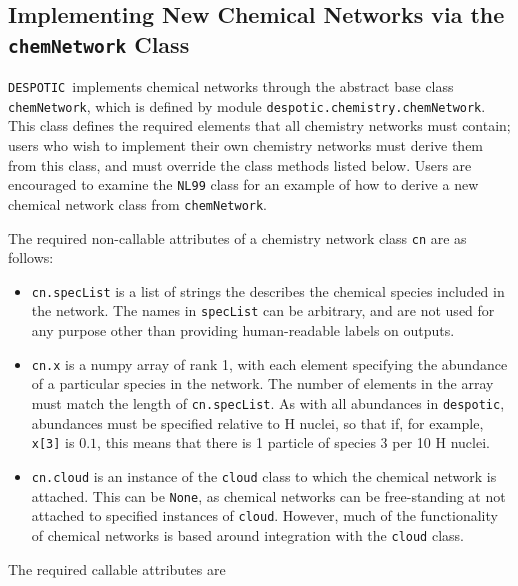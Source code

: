 \documentclass[12pt]{article}
\newcommand{\despotic}{\texttt{DESPOTIC}}
\begin{document}
\subsection{Implementing New Chemical Networks via the \texttt{chemNetwork} Class}

\despotic\ implements chemical networks through the abstract base class \verb=chemNetwork=, which is defined by module \verb=despotic.chemistry.chemNetwork=. This class defines the required elements that all chemistry networks must contain; users who wish to implement their own chemistry networks must derive them from this class, and must override the class methods listed below. Users are encouraged to examine the \verb=NL99= class for an example of how to derive a new chemical network class from \verb=chemNetwork=.

The required non-callable attributes of a chemistry network class \verb=cn= are as follows:
\begin{itemize}
\item \verb=cn.specList= is a list of strings the describes the chemical species included in the network. The names in \verb=specList= can be arbitrary, and are not used for any purpose other than providing human-readable labels on outputs.
\item \verb=cn.x= is a numpy array of rank 1, with each element specifying the abundance of a particular species in the network. The number of elements in the array must match the length of \verb=cn.specList=. As with all abundances in \verb=despotic=, abundances must be specified relative to H nuclei, so that if, for example, \verb=x[3]= is $0.1$, this means that there is 1 particle of species 3 per 10 H nuclei.
\item \verb=cn.cloud= is an instance of the \verb=cloud= class to which the chemical network is attached. This can be \verb=None=, as chemical networks can be free-standing at not attached to specified instances of \verb=cloud=. However, much of the functionality of chemical networks is based around integration with the \verb=cloud= class.
\end{itemize}
The required callable attributes are
\end{document}
